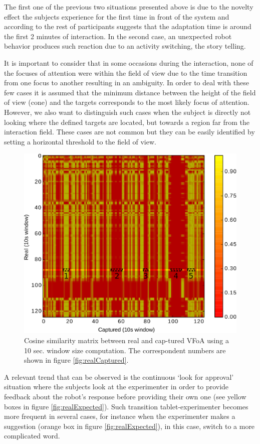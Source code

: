 \documentclass{sig-alternate}
\begin{document}
The first one of the previous two situations presented above is due to the
novelty effect the subjects experience for the first time in front of the system
and according to the rest of participants suggests that the adaptation time is
around the first 2 minutes of interaction. In the second case, an unexpected
robot behavior produces such reaction due to an activity switching, the story
telling.

It is important to consider that in some occasions during the interaction, none
of the focuses of attention were within the field of view due to the time
transition from one focus to another resulting in an ambiguity. In order to deal
with these few cases it is assumed that the minimum distance between the height
of the field of view (cone) and the targets corresponds to the most likely focus
of attention. However, we also want to distinguish such cases when the subject
is directly not looking where the defined targets are located, but towards a
region far from the interaction field. These cases are not common but they can
be easily identified by setting a horizontal threshold to the field of view.

\begin{figure}[h!]
    \centering
    \includegraphics[width=0.7\columnwidth]{bitmap}
    \caption{\small Cosine similarity matrix between real and cap-tured VFoA
    using a 10 sec. window size computation. The correspondent numbers are shown
    in figure \ref{fig:realCaptured}.}
    \label{fig:bitmap}
\end{figure}

A relevant trend that can be observed is the continuous `look for approval'
situation where the subjects look at the experimenter in order to provide
feedback about the robot's response before providing their own one (see yellow
boxes in figure \ref{fig:realExpected}). Such transition tablet-experimenter
becomes more frequent in several cases, for instance when the experimenter makes
a suggestion (orange box in figure \ref{fig:realExpected}), in this case, switch
to a more complicated word.
\end{document}
